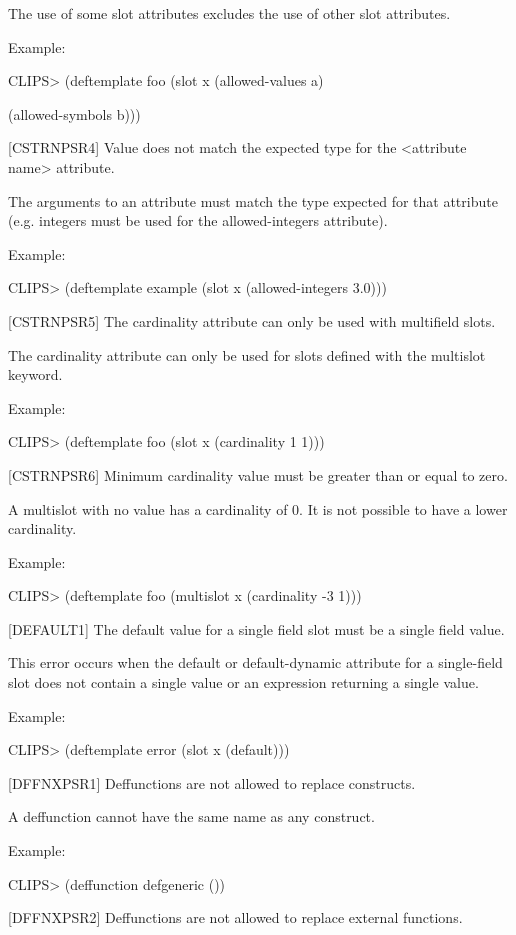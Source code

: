 \documentclass[letterpaper,10pt,english]{sphinxmanual}
\begin{document}
The use of some slot attributes excludes the use of other slot
attributes.

Example:

CLIPS\textgreater{} (deftemplate foo (slot x (allowed-values a)

(allowed-symbols b)))

{[}CSTRNPSR4{]} Value does not match the expected type for the \textless{}attribute
name\textgreater{} attribute.

The arguments to an attribute must match the type expected for that
attribute (e.g. integers must be used for the allowed-integers
attribute).

Example:

CLIPS\textgreater{} (deftemplate example (slot x (allowed-integers 3.0)))

{[}CSTRNPSR5{]} The cardinality attribute can only be used with multifield
slots.

The cardinality attribute can only be used for slots defined with the
multislot keyword.

Example:

CLIPS\textgreater{} (deftemplate foo (slot x (cardinality 1 1)))

{[}CSTRNPSR6{]} Minimum cardinality value must be greater than or equal to
zero.

A multislot with no value has a cardinality of 0. It is not possible to
have a lower cardinality.

Example:

CLIPS\textgreater{} (deftemplate foo (multislot x (cardinality -3 1)))

{[}DEFAULT1{]} The default value for a single field slot must be a single
field value.

This error occurs when the default or default-dynamic attribute for a
single-field slot does not contain a single value or an expression
returning a single value.

Example:

CLIPS\textgreater{} (deftemplate error (slot x (default)))

{[}DFFNXPSR1{]} Deffunctions are not allowed to replace constructs.

A deffunction cannot have the same name as any construct.

Example:

CLIPS\textgreater{} (deffunction defgeneric ())

{[}DFFNXPSR2{]} Deffunctions are not allowed to replace external functions.
\end{document}
